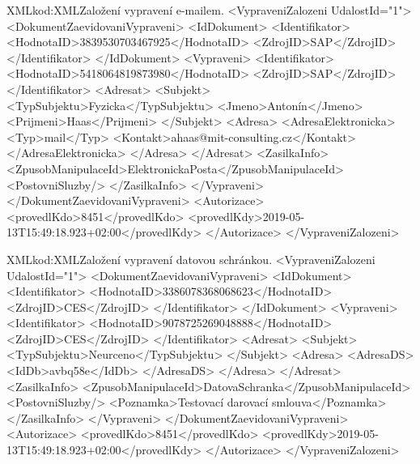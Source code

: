 \documentclass[
  master,
  field=ainfp,
  biblatex,
  language=czech,
  glossaries,
  theorems=false,
  index
]{kidiplom}
\begin{document}
\begin{kicode}{XML}{kod:XML}{Založení vypravení e-mailem.}
<VypraveniZalozeni UdalostId="1">
    <DokumentZaevidovaniVypraveni>
        <IdDokument>
            <Identifikator>
                <HodnotaID>3839530703467925</HodnotaID>
                <ZdrojID>SAP</ZdrojID>
            </Identifikator>
        </IdDokument>
        <Vypraveni>
            <Identifikator>
                <HodnotaID>5418064819873980</HodnotaID>
                <ZdrojID>SAP</ZdrojID>
            </Identifikator>
            <Adresat>
                <Subjekt>
                    <TypSubjektu>Fyzicka</TypSubjektu>
                    <Jmeno>Antonín</Jmeno>
                    <Prijmeni>Haas</Prijmeni>
                </Subjekt>
                <Adresa>
                    <AdresaElektronicka>
                        <Typ>mail</Typ>
                        <Kontakt>ahaas@mit-consulting.cz</Kontakt>
                    </AdresaElektronicka>
                </Adresa>
            </Adresat>
            <ZasilkaInfo>
                <ZpusobManipulaceId>ElektronickaPosta</ZpusobManipulaceId>
                <PostovniSluzby/>
            </ZasilkaInfo>
        </Vypraveni>
    </DokumentZaevidovaniVypraveni>
    <Autorizace>
        <provedlKdo>8451</provedlKdo>
        <provedlKdy>2019-05-13T15:49:18.923+02:00</provedlKdy>
    </Autorizace>
</VypraveniZalozeni>
\end{kicode}

\begin{kicode}{XML}{kod:XML}{Založení vypravení datovou schránkou.}
<VypraveniZalozeni UdalostId="1">
    <DokumentZaevidovaniVypraveni>
        <IdDokument>
            <Identifikator>
                <HodnotaID>3386078368068623</HodnotaID>
                <ZdrojID>CES</ZdrojID>
            </Identifikator>
        </IdDokument>
        <Vypraveni>
            <Identifikator>
                <HodnotaID>9078725269048888</HodnotaID>
                <ZdrojID>CES</ZdrojID>
            </Identifikator>
            <Adresat>
                <Subjekt>
                    <TypSubjektu>Neurceno</TypSubjektu>
                </Subjekt>
                <Adresa>
                    <AdresaDS>
                        <IdDb>avbq58e</IdDb>
                    </AdresaDS>
                </Adresa>
            </Adresat>
            <ZasilkaInfo>
                <ZpusobManipulaceId>DatovaSchranka</ZpusobManipulaceId>
                <PostovniSluzby/>
                <Poznamka>Testovací darovací smlouva</Poznamka>
            </ZasilkaInfo>
        </Vypraveni>
    </DokumentZaevidovaniVypraveni>
    <Autorizace>
        <provedlKdo>8451</provedlKdo>
        <provedlKdy>2019-05-13T15:49:18.923+02:00</provedlKdy>
    </Autorizace>
</VypraveniZalozeni>
\end{kicode}
\end{document}
